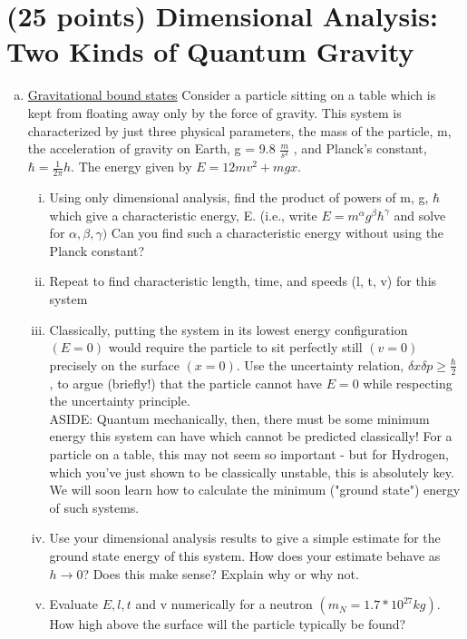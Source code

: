 \documentclass[ps1.tex]{subfiles}
\begin{document}
\section* {(25 points) Dimensional Analysis: Two Kinds of Quantum Gravity}
\begin{enumerate}[(a)]
\item \underline{Gravitational bound states}
\noindent
Consider a particle sitting on a table which is kept from floating away only by the
force of gravity. This system is characterized by just three physical parameters,
the mass of the particle, m, the acceleration of gravity on Earth, g = 9.8 $\frac {m}{s^2}$ , and
Planck's constant, $\hbar = \frac {1}{2\pi}h$. The energy given by $E = 12 mv^2 + mgx$.
\begin{enumerate}[i.]
\item Using only dimensional analysis, find the product of powers of m, g, $\hbar$ which give a characteristic energy, E. (i.e., write $E =  m^{\alpha}g^{\beta}\hbar^{\gamma}$ and solve for $\alpha, \beta, \gamma)$ Can you find such a characteristic energy without using the Planck constant?
\item Repeat to find characteristic length, time, and speeds (l, t, v) for this system
\item Classically, putting the system in its lowest energy configuration $(E=0)$ would require 
the particle to sit perfectly still $(v = 0)$ precisely on the surface $(x = 0)$. 
Use the uncertainty relation, $\delta x \delta p \ge \frac {\hbar}{2}$ , to argue (briefly!) that the particle cannot have $E = 0$ while respecting the uncertainty principle. \\
ASIDE: Quantum mechanically, then, there must be some minimum energy this system can have which cannot be predicted classically! For a particle on a table, this may not seem so important - but for Hydrogen, which you've just shown to be classically unstable, this is absolutely key. We will soon learn how to calculate the minimum ("ground state") energy of such systems.
\item Use your dimensional analysis results to give a simple estimate for the ground state energy of this system. How does your estimate behave as $h \rightarrow 0$? Does this make sense? Explain why or why not.
\item Evaluate $E, l, t $ and v numerically for a neutron $(m_N = 1.7*10^{27}kg)$. How high above the surface will the particle typically be found?
\end{enumerate}


\end{enumerate}
\end{document}
